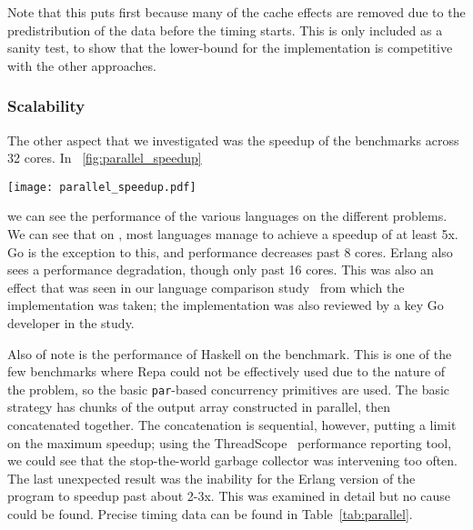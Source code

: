 Note that this puts {\qsname} first because many of the cache effects
are removed due to the predistribution of the data before
the timing starts.
This is only included as a sanity test,
to show that the lower-bound for the {\qsname} implementation
is competitive with the other approaches.

\subsubsection{Scalability} The other aspect that we investigated was the speedup of
the benchmarks across 32 cores.
In \fig~\ref{fig:parallel_speedup}
\begin{figure*}[htb]
  \centering
  \texttt{[image: parallel\_speedup.pdf]}
  \caption{Speedup over single-core performance, up to 32 cores}
  \label{fig:parallel_speedup}
\end{figure*}
we can see the performance of
the various languages on the different problems.
We can see that on , 
most languages manage to achieve a speedup of at least 5x.
Go is the exception to this, and performance decreases past 8 cores.
Erlang also sees a performance degradation,
though only past 16 cores.
This was also an effect that was seen in 
our language comparison
study~\cite{nanz-et-al:2013:benchmarking-multicore-languages}
from which the implementation was taken;
the implementation was also reviewed by a key Go developer in the study.

Also of note is the performance of Haskell on the  benchmark.
This is one of the few benchmarks where Repa could not be effectively
used due to the nature of the problem,
so the basic \texttt{par}-based concurrency primitives are used.
The basic strategy has chunks of the output array constructed
in parallel, then concatenated together.
The concatenation is sequential, however, putting a limit on the
maximum speedup;
using the ThreadScope~\cite{Wheeler:2010:VMM:1673012.1673015} performance 
reporting tool, we could see that
the stop-the-world garbage collector was intervening too often.
The last unexpected result was the inability for the Erlang
version of the  program to speedup past about 2-3x.
This was examined in detail but no cause could be found.
Precise timing data can be found in Table~\ref{tab:parallel}.


